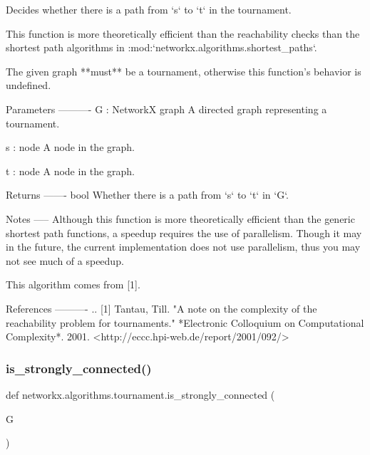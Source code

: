 \begin{DoxyVerb}
\begin{DoxyVerb}Decides whether there is a path from `s` to `t` in the
tournament.

This function is more theoretically efficient than the reachability
checks than the shortest path algorithms in
:mod:`networkx.algorithms.shortest_paths`.

The given graph **must** be a tournament, otherwise this function's
behavior is undefined.

Parameters
----------
G : NetworkX graph
    A directed graph representing a tournament.

s : node
    A node in the graph.

t : node
    A node in the graph.

Returns
-------
bool
    Whether there is a path from `s` to `t` in `G`.

Notes
-----
Although this function is more theoretically efficient than the
generic shortest path functions, a speedup requires the use of
parallelism. Though it may in the future, the current implementation
does not use parallelism, thus you may not see much of a speedup.

This algorithm comes from [1].

References
----------
.. [1] Tantau, Till.
       "A note on the complexity of the reachability problem for
       tournaments."
       *Electronic Colloquium on Computational Complexity*. 2001.
       <http://eccc.hpi-web.de/report/2001/092/>
\end{DoxyVerb}
 \mbox{\label{namespacenetworkx_1_1algorithms_1_1tournament_a2e02266052eea4c0359eec64b9b9f694}} 
\subsubsection{\texorpdfstring{is\+\_\+strongly\+\_\+connected()}{is\_strongly\_connected()}}
{\footnotesize\ttfamily def networkx.\+algorithms.\+tournament.\+is\+\_\+strongly\+\_\+connected (\begin{DoxyParamCaption}\item[{}]{G }\end{DoxyParamCaption})}


\end{DoxyVerb}
